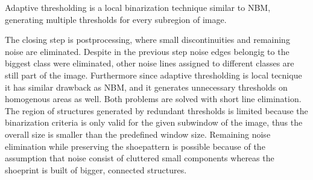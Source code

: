 \documentclass[draft,final]{vutinfth} %
\begin{document}
Adaptive thresholding is a local binarization technique similar to NBM, generating multiple thresholds for every subregion of image.
\par
The closing step is postprocessing, where small discontinuities and remaining noise are eliminated.
Despite in the previous step noise edges belongig to the biggest class were eliminated, other noise lines assigned to different classes are still part of the image.
Furthermore since adaptive thresholding is local tecnique it has similar drawback as NBM, and it generates unnecessary thresholds on homogenous areas as well.
Both problems are solved with short line elimination.
The region of structures generated by redundant thresholds is limited because the binarization criteria is only valid for the given subwindow of the image, thus the overall size is smaller than the predefined window size.
Remaining noise elimination while preserving the shoepattern is possible because of the assumption that noise consist of cluttered small components whereas the shoeprint is built of bigger, connected structures.
\end{document}

